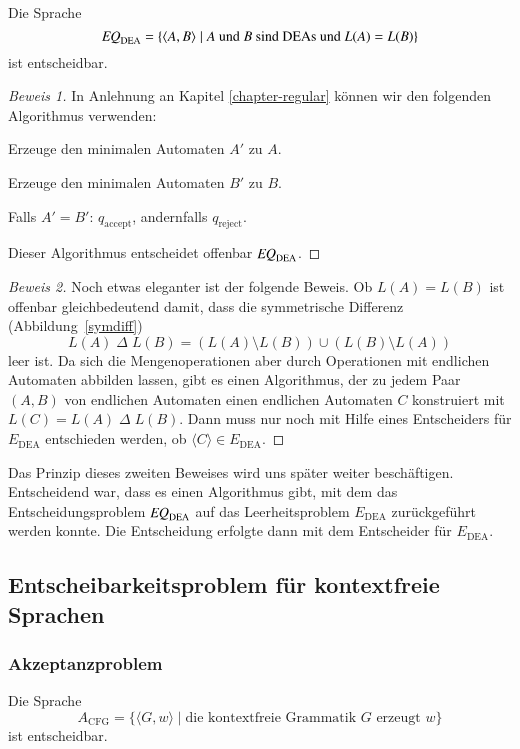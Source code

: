 \begin{satz}
\label{satz:eqdea}
Die Sprache
\[
\text{\it EQ}_{\text{DEA}}=\{
\langle A,B\rangle\;|\;\text{$A$ und $B$ sind DEAs und $L(A)=L(B)$}
\}
\]
%
ist entscheidbar.
\end{satz}

\begin{proof}[Beweis 1]
In Anlehnung an Kapitel \ref{chapter-regular} können wir den folgenden
Algorithmus verwenden:
\medskip
\begin{compactenum}
\item Erzeuge den minimalen Automaten $A'$ zu $A$.
\item Erzeuge den minimalen Automaten $B'$ zu $B$.
\item Falls $A'=B'$: $q_{\text{accept}}$, andernfalls $q_{\text{reject}}$.
\end{compactenum}
\medskip
Dieser Algorithmus entscheidet offenbar 
$\text{\it EQ}_{\text{DEA}}$.
\end{proof}

\begin{proof}[Beweis 2]
Noch etwas eleganter ist der folgende Beweis.
Ob $L(A)=L(B)$ ist
offenbar gleichbedeutend damit, dass die symmetrische Differenz
(Abbildung~\ref{symdiff})
\[
L(A){\;\Delta\;} L(B)=
(L(A)\setminus L(B)) \cup (L(B)\setminus L(A))
\]
leer ist.
Da sich die Mengenoperationen aber durch Operationen mit
endlichen Automaten abbilden lassen, gibt es einen Algorithmus,
der  zu jedem Paar $(A,B)$
von endlichen Automaten  einen endlichen Automaten $C$ konstruiert mit
$L(C)=L(A){\;\Delta\;} L(B)$.
Dann muss nur noch mit Hilfe eines Entscheiders
für $E_{\text{DEA}}$ entschieden werden, ob $\langle C\rangle\in
E_{\text{DEA}}$.
\end{proof}

Das Prinzip dieses zweiten Beweises wird uns später weiter beschäftigen.
Entscheidend war, dass es einen Algorithmus gibt, mit dem das
Entscheidungsproblem 
$\text{\it EQ}_{\text{DEA}}$
auf das Leerheitsproblem
$E_{\text{DEA}}$ zurückgeführt werden konnte.
Die Entscheidung erfolgte dann mit dem Entscheider für
$E_{\text{DEA}}$.

\subsection{Entscheibarkeitsproblem für kontextfreie Sprachen}
\subsubsection{Akzeptanzproblem}
%
\begin{satz}
\label{satz:acfg-entscheidbar}
Die Sprache
\[
A_{\text{CFG}}=\{
\langle G,w\rangle\;|\; \text{die kontextfreie Grammatik $G$ erzeugt $w$}
\}
\]
ist entscheidbar.
%
\end{satz}

